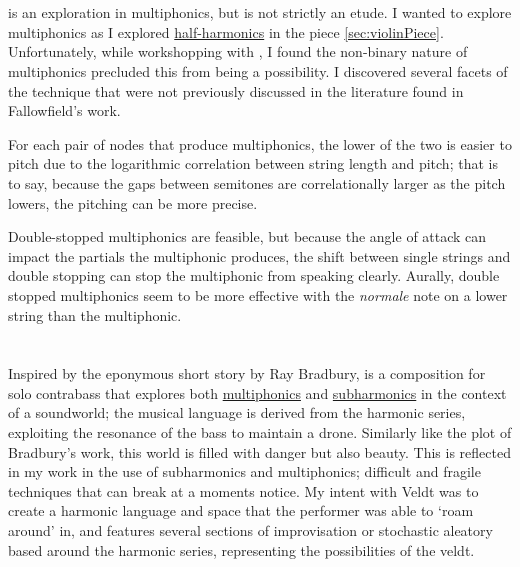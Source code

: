 \section{\celloPiece}\label{sec:celloPiece}

\celloPiece\space is an exploration in multiphonics, but is not strictly an etude.
I wanted to explore multiphonics as I explored \hyperref[sec:half-harmonics]{half-harmonics} in the piece \autoref{sec:violinPiece}.
Unfortunately, while workshopping with \celloParticipant, I found the non-binary nature of multiphonics precluded this from being a possibility.\autocite[]{smithFeedbackCelloSightreading2019}
I discovered several facets of the technique that were not previously discussed in the literature found in Fallowfield's work.\autocite[]{fallowfieldCelloMap}

For each pair of nodes that produce multiphonics, the lower of the two is easier to pitch due to the logarithmic correlation between string length and pitch;
that is to say, because the gaps between semitones are correlationally larger as the pitch lowers, the pitching can be more precise.

Double-stopped multiphonics are feasible, but because the angle of attack can impact the partials the multiphonic produces, the shift between single strings and double stopping can stop the multiphonic from speaking clearly.
Aurally, double stopped multiphonics seem to be more effective with the \emph{normale} note on a lower string than the multiphonic.



\section{\bassPiece}\label{sec:bassPiece}
Inspired by the eponymous short story by Ray Bradbury, \bassPiece\space is a composition for solo contrabass that explores both \hyperref[sec:multiphonicsDiscussion]{multiphonics} and \hyperref[sec:subharmonicsDiscussion]{subharmonics} in the context of a soundworld; the musical language is derived from the harmonic series, exploiting the resonance of the bass to maintain a drone.\autocite[]{bradburyVeldt1951}
Similarly like the plot of Bradbury's work, this world is filled with danger but also beauty. 
This is reflected in my work in the use of subharmonics and multiphonics; difficult and fragile techniques that can break at a moments notice.
My intent with Veldt was to create a harmonic language and space that the performer was able to `roam around' in, and features several sections of improvisation or stochastic aleatory based around the harmonic series, representing the possibilities of the veldt.


